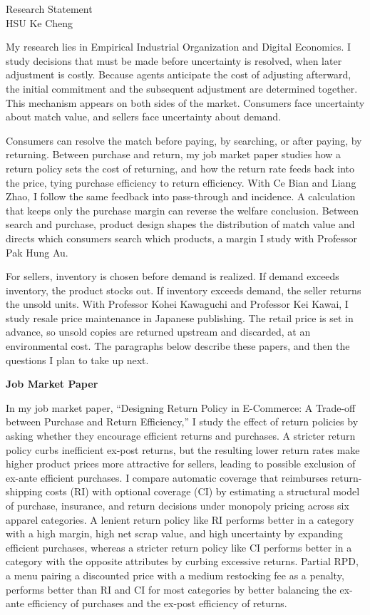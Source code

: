 \documentclass[11pt]{article}
\begin{document}
\begin{center}
{\Large Research Statement}\\[0.3em]
HSU Ke Cheng
\end{center}

My research lies in Empirical Industrial Organization and Digital Economics. I study decisions that must be made before uncertainty is resolved, when later adjustment is costly. Because agents anticipate the cost of adjusting afterward, the initial commitment and the subsequent adjustment are determined together. This mechanism appears on both sides of the market. Consumers face uncertainty about match value, and sellers face uncertainty about demand.

Consumers can resolve the match before paying, by searching, or after paying, by returning. Between purchase and return, my job market paper studies how a return policy sets the cost of returning, and how the return rate feeds back into the price, tying purchase efficiency to return efficiency. With Ce Bian and Liang Zhao, I follow the same feedback into pass-through and incidence. A calculation that keeps only the purchase margin can reverse the welfare conclusion. Between search and purchase, product design shapes the distribution of match value and directs which consumers search which products, a margin I study with Professor Pak Hung Au.

For sellers, inventory is chosen before demand is realized. If demand exceeds inventory, the product stocks out. If inventory exceeds demand, the seller returns the unsold units. With Professor Kohei Kawaguchi and Professor Kei Kawai, I study resale price maintenance in Japanese publishing. The retail price is set in advance, so unsold copies are returned upstream and discarded, at an environmental cost. The paragraphs below describe these papers, and then the questions I plan to take up next.

\textbf{Job Market Paper}

In my job market paper, ``Designing Return Policy in E-Commerce: A Trade-off between Purchase and Return Efficiency,'' I study the effect of return policies by asking whether they encourage efficient returns and purchases. A stricter return policy curbs inefficient ex-post returns, but the resulting lower return rates make higher product prices more attractive for sellers, leading to possible exclusion of ex-ante efficient purchases. I compare automatic coverage that reimburses return-shipping costs (RI) with optional coverage (CI) by estimating a structural model of purchase, insurance, and return decisions under monopoly pricing across six apparel categories. A lenient return policy like RI performs better in a category with a high margin, high net scrap value, and high uncertainty by expanding efficient purchases, whereas a stricter return policy like CI performs better in a category with the opposite attributes by curbing excessive returns. Partial RPD, a menu pairing a discounted price with a medium restocking fee as a penalty, performs better than RI and CI for most categories by better balancing the ex-ante efficiency of purchases and the ex-post efficiency of returns.
\end{document}
